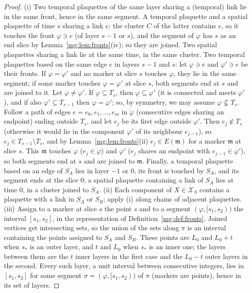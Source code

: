 \documentclass[11pt,a4paper]{article}
\theoremstyle{definition}
\theoremstyle{remark}
\newcommand{\cX}{\mathcal{X}}
\begin{document}
\begin{proof}
(i) Two temporal plaquettes of the same layer sharing a (temporal) link lie in the same front, hence in the same segment. A temporal plaquette and a
spatial plaquette of time $s$ sharing a link $e$: the cluster $C$ of the latter contains $e$, so it touches the front $\varphi\ni e$ (of layer $s-1$ or $s$), and
the segment of $\varphi$ has $s$ as an end slice by Lemma~\ref{mg:lem:fronts}(iv); so they are joined. Two spatial plaquettes sharing a link lie at
the same time, in the same cluster. Two temporal plaquettes based on the same edge $e$ in layers $s-1$ and $s$: let $\varphi\ni e$ and $\varphi'\ni e$ be
their fronts. If $\varphi=\varphi'$ and no marker at slice $s$ touches $\varphi$, they lie in the same segment; if some marker touches $\varphi=\varphi'$ at slice
$s$, both segments end at $s$ and are joined to it. Let $\varphi\neq\varphi'$. If $\varphi\subseteq T_s$, then $\varphi\subseteq\varphi'$ (it is connected and
meets $\varphi'$), and if also $\varphi'\subseteq T_{s-1}$ then $\varphi=\varphi'$; so, by symmetry, we may assume $\varphi\not\subseteq T_s$. Follow a path of edges
$e=e_0,e_1,\dots,e_m$ in $\varphi$ (consecutive edges sharing an endpoint) ending outside $T_s$, and let $e_j$ be its first edge outside $\varphi'$. Then
$e_j\notin T_s$ (otherwise it would lie in the component $\varphi'$ of its neighbour $e_{j-1}$), so $e_j\in T_{s-1}\setminus T_s$, and by
Lemma~\ref{mg:lem:fronts}(ii) $e_j\in E(\mathfrak m)$ for a marker $\mathfrak m$ at slice $s$. This $\mathfrak m$ touches $\varphi$ ($e_j\in\varphi$) and $\varphi'$
($e_j$ shares an endpoint with $e_{j-1}\in\varphi'$), so both segments end at $s$ and are joined to $\mathfrak m$. Finally, a temporal plaquette based on an
edge of $S_A$ lies in layer $-1$ or $0$, its front is touched by $S_A$, and its segment ends at the slice $0$; a spatial plaquette containing a link of
$S_A$ lies at time $0$, in a cluster joined to $S_A$.
(ii) Each component of $X\in\cX_S$ contains a plaquette with a link in $S_A$ or $S_B$; apply (i) along chains of adjacent plaquettes.
(iii) Assign to a marker at slice $s$ the point $s$ and to a segment $(\varphi,[s_1,s_2))$ the interval $[s_1,s_2]$, in the representation of
Definition~\ref{mg:def:fronts}. Joined vertices get intersecting sets, so the union of the sets along $\pi$ is an interval containing the points
assigned to $S_A$ and $S_B$. These points are $L_0$ and $L_0+t$ when $s_*$ is an outer layer, and $t$ and $L_0$ when $s_*$ is an inner one; the layers
between them are the $t$ inner layers in the first case and the $L_0-t$ outer layers in the second. Every such layer, a unit interval between
consecutive integers, lies in $[s_1,s_2]$ for some segment $\sigma=(\varphi,[s_1,s_2))$ of $\pi$ (markers are points), hence in its set of layers.
\end{proof}
\end{document}
